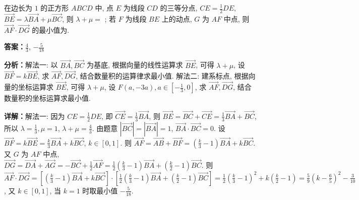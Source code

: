 \begin{question}[points=5]
在边长为 $1$ 的正方形 $ABCD$ 中, 点 $E$ 为线段 $CD$ 的三等分点, $CE = \frac{1}{2}DE$, $\overrightarrow{BE} = \lambda \overrightarrow{BA} + \mu \overrightarrow{BC}$, 则 $\lambda+\mu =$ ; 若 $F$ 为线段 $BE$ 上的动点, $G$ 为 $AF$ 中点, 则 $\overrightarrow{AF} \cdot \overrightarrow{DG}$ 的最小值为.
\begin{solution}
\textbf{答案：}$\frac{4}{3}$, $-\frac{5}{18}$

\textbf{分析：}解法一: 以 $\overrightarrow{BA},\overrightarrow{BC}$ 为基底, 根据向量的线性运算求 $\overrightarrow{BE}$, 可得 $\lambda+\mu$, 设 $\overrightarrow{BF}=k\overrightarrow{BE}$, 求 $\overrightarrow{AF},\overrightarrow{DG}$, 结合数量积的运算律求最小值. 解法二: 建系标点, 根据向量的坐标运算求 $\overrightarrow{BE}$, 可得 $\lambda+\mu$, 设 $F(a,-3a),a\in[-\frac{1}{3},0]$, 求 $\overrightarrow{AF},\overrightarrow{DG}$, 结合数量积的坐标运算求最小值.

\textbf{详解：}解法一: 因为 $CE=\frac{1}{2}DE$, 即 $\overrightarrow{CE}=\frac{1}{3}\overrightarrow{BA}$, 则 $\overrightarrow{BE}=\overrightarrow{BC}+\overrightarrow{CE}=\frac{1}{3}\overrightarrow{BA}+\overrightarrow{BC}$, 所以 $\lambda=\frac{1}{3},\mu=1$, $\lambda+\mu=\frac{4}{3}$. 由题意 $|\overrightarrow{BC}|=|\overrightarrow{BA}|=1$, $\overrightarrow{BA}\cdot\overrightarrow{BC}=0$. 设 $\overrightarrow{BF}=k\overrightarrow{BE}= \frac{k}{3}\overrightarrow{BA}+k\overrightarrow{BC}$, $k\in[0,1]$. 则 $\overrightarrow{AF}=\overrightarrow{AB}+\overrightarrow{BF}=(\frac{k}{3}-1)\overrightarrow{BA}+k\overrightarrow{BC}$. 又 $G$ 为 $AF$ 中点, $\overrightarrow{DG}=\overrightarrow{DA}+\overrightarrow{AG}=-\overrightarrow{BC}+\frac{1}{2}\overrightarrow{AF}=\frac{1}{2}(\frac{k}{3}-1)\overrightarrow{BA}+(\frac{k}{2}-1)\overrightarrow{BC}$. 则 $\overrightarrow{AF}\cdot\overrightarrow{DG}=[ (\frac{k}{3}-1)\overrightarrow{BA}+k\overrightarrow{BC} ]\cdot[\frac{1}{2}(\frac{k}{3}-1)\overrightarrow{BA}+(\frac{k}{2}-1)\overrightarrow{BC}] =\frac{1}{2}(\frac{k}{3}-1)^2 + k(\frac{k}{2}-1)=\frac{5}{9}(k-\frac{6}{5})^2-\frac{3}{10}$, 又 $k\in[0,1]$, 当 $k=1$ 时取最小值 $-\frac{5}{18}$.
\end{solution}
\end{question}

